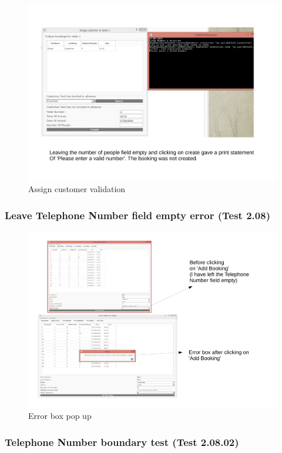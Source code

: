 \begin{landscape}
\begin{figure}[H]
    \includegraphics[width = 20cm]{./Testing/images/test4.pdf}
    \caption{Assign customer validation} \label{fig:Test4}
\end{figure}

\subsubsection{Leave Telephone Number field empty error (Test 2.08)}

\begin{figure}[H]
    \includegraphics[width = 20cm]{./Testing/images/test12}
    \caption{Error box pop up} \label{fig:Test12}
\end{figure}

\subsubsection{Telephone Number boundary test (Test 2.08.02)}


\end{landscape}
